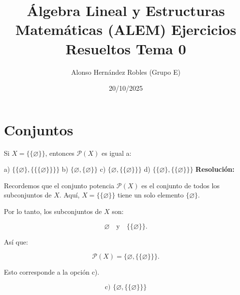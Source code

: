 \documentclass[a4paper,12pt]{article}
\title{Álgebra Lineal y Estructuras Matemáticas (ALEM) Ejercicios Resueltos Tema 0}
\author{Alonso Hernández Robles (Grupo E)}
\date{20/10/2025}
\begin{document}
\maketitle

\tableofcontents
\newpage

\section{Conjuntos}

\begin{ejercicio}[title=Ejercicio 4]
Si $X = \{\{\varnothing\}\}$, entonces $\mathcal{P}(X)$ es igual a:

a) $\{\{\varnothing\},\{\{\{\varnothing\}\}\}\}$ \quad
b) $\{\varnothing,\{\varnothing\}\}$ \quad
c) $\{\varnothing,\{\{\varnothing\}\}\}$ \quad
d) $\{\{\varnothing\},\{\{\varnothing\}\}\}$
\tcblower
\textbf{Resolución:}

Recordemos que el conjunto potencia $\mathcal{P}(X)$ es el conjunto de todos los subconjuntos de $X$.  
Aquí, $X = \{\{\varnothing\}\}$ tiene un solo elemento $\{\varnothing\}$.  

Por lo tanto, los subconjuntos de $X$ son:

\[
\varnothing \quad \text{y} \quad \{\{\varnothing\}\}.
\]

Así que:

\[
\mathcal{P}(X) = \{\varnothing, \{\{\varnothing\}\}\}.
\]

Esto corresponde a la opción c).

\[
\boxed{\text{c) } \{\varnothing, \{\{\varnothing\}\}\}}
\]

\end{ejercicio}
\end{document}
